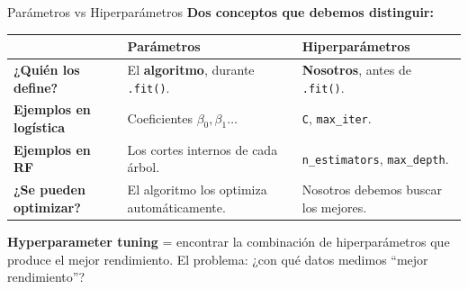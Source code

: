 \documentclass[aspectratio=169, 11pt]{beamer}
\begin{document}
\begin{frame}{Parámetros vs Hiperparámetros}
  \vspace{-4pt}
  {\footnotesize\color{arcaDark}\bfseries
    Dos conceptos que debemos distinguir:}

  \vspace{6pt}
  {\scriptsize
  \begin{tabular}{@{}p{3cm}p{5cm}p{4.5cm}@{}}
    \toprule
     & \textbf{\color{codeBlue}Parámetros} & \textbf{\color{arcaRed}Hiperparámetros} \\
    \midrule
    \textbf{¿Quién los define?} & El \textbf{algoritmo}, durante \texttt{.fit()}. & \textbf{Nosotros}, antes de \texttt{.fit()}. \\
    \textbf{Ejemplos en logística} & Coeficientes $\beta_0, \beta_1\ldots$ & \texttt{C}, \texttt{max\_iter}. \\
    \textbf{Ejemplos en RF} & Los cortes internos de cada árbol. & \texttt{n\_estimators}, \texttt{max\_depth}. \\
    \textbf{¿Se pueden optimizar?} & El algoritmo los optimiza automáticamente. & Nosotros debemos buscar los mejores. \\
    \bottomrule
  \end{tabular}
  }

  \vspace{6pt}
  \begin{tcolorbox}[colback=arcaGray, colframe=arcaRed, boxrule=0.5pt, arc=2pt,
    left=6pt, right=6pt, top=4pt, bottom=4pt]
    {\scriptsize\color{arcaDark}
    \faKey\hspace{4pt}\textbf{Hyperparameter tuning} = encontrar la
    combinación de hiperparámetros que produce el mejor rendimiento.
    El problema: ¿con qué datos medimos ``mejor rendimiento''?}
  \end{tcolorbox}
\end{frame}
\end{document}
